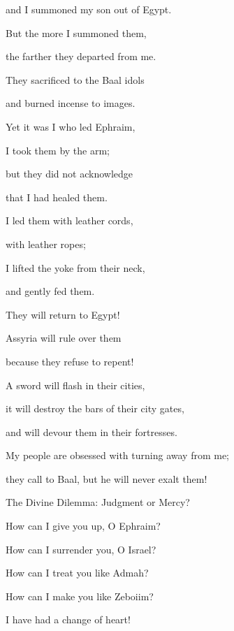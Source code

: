 {\par }{\Q and I summoned
my son
out of Egypt.
\par }{\Q {}But the more I summoned
them,
\par }{\Q the farther
they departed
from me.
\par }{\Q They sacrificed
to the Baal idols
\par }{\Q and burned incense
to images.
\par }{\Q {}Yet it was I
who led
Ephraim,
\par }{\Q I took
them by
the arm;
\par }{\Q but they did not
acknowledge
\par }{\Q that
I had
healed them.
\par }{\Q {}I led
them with leather
cords,
\par }{\Q with leather
ropes;
\par }{\Q I lifted
the yoke
from
their neck,
\par }{\Q and gently
fed them.
\par }{\Q {}They will return
to
Egypt!

\par }{\Q Assyria
will rule over
them

\par }{\Q because
they refuse
to repent!
\par }{\Q {}A sword
will flash
in their cities,
\par }{\Q it will destroy
the bars of
their city gates,
\par }{\Q and will devour
them in their fortresses.
\par }{\Q {}My people
are obsessed
with turning away
from me;
\par }{\Q they call
to Baal,
but he will never
exalt them!
\par }{\SH The Divine Dilemma: Judgment or Mercy?
\par }{\Q {}How
can I give
you up, O Ephraim?
\par }{\Q How can I surrender
you, O Israel?
\par }{\Q How
can I treat
you like Admah?
\par }{\Q How can I make
you like Zeboiim?
\par }{\Q I have had a change of heart!

}
